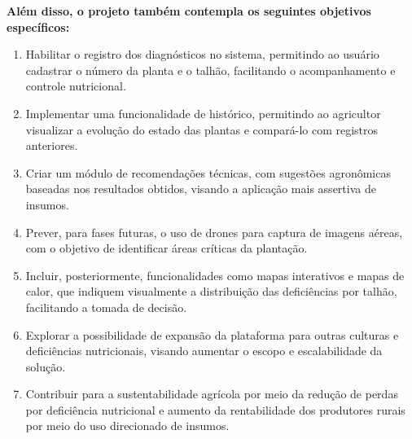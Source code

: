 \textbf{Além disso, o projeto também contempla os seguintes objetivos específicos:}
\begin{enumerate}
\item Habilitar o registro dos diagnósticos no sistema, permitindo ao usuário cadastrar o número da planta e o talhão, facilitando o acompanhamento e controle nutricional.
\item Implementar uma funcionalidade de histórico, permitindo ao agricultor visualizar a evolução do estado das plantas e compará-lo com registros anteriores.
\item Criar um módulo de recomendações técnicas, com sugestões agronômicas baseadas nos resultados obtidos, visando a aplicação mais assertiva de insumos.
\item Prever, para fases futuras, o uso de drones para captura de imagens aéreas, com o objetivo de identificar áreas críticas da plantação.
\item Incluir, posteriormente, funcionalidades como mapas interativos e mapas de calor, que indiquem visualmente a distribuição das deficiências por talhão, facilitando a tomada de decisão.
\item Explorar a possibilidade de expansão da plataforma para outras culturas e deficiências nutricionais, visando aumentar o escopo e escalabilidade da solução.
\item Contribuir para a sustentabilidade agrícola por meio da redução de perdas por deficiência nutricional e aumento da rentabilidade dos produtores rurais por meio do uso direcionado de insumos.
\end{enumerate}